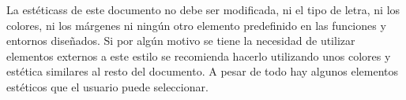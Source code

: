 
La estéticass de este documento no debe ser modificada, ni el tipo de letra, ni los colores, ni los márgenes ni ningún otro elemento predefinido en las funciones y entornos diseñados. Si por algún motivo se tiene la necesidad de utilizar elementos externos a este estilo se recomienda hacerlo utilizando unos colores y estética similares al resto del documento. A pesar de todo hay algunos elementos estéticos que el usuario puede seleccionar.
